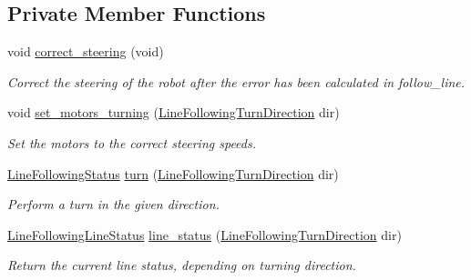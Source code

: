\subsection*{Private Member Functions}
\begin{DoxyCompactItemize}
\item 
void \hyperlink{classIDP_1_1LineFollowing_a91695c96ef09bd407b9b57dd7f6fcdfa}{correct\_\-steering} (void)
\begin{DoxyCompactList}\small\item\em Correct the steering of the robot after the error has been calculated in follow\_\-line. \item\end{DoxyCompactList}\item 
void \hyperlink{classIDP_1_1LineFollowing_a5eeec6030c425b39a8571dcb55454465}{set\_\-motors\_\-turning} (\hyperlink{namespaceIDP_aba52d8ae6ecf9eb4c7edb518bcc02544}{LineFollowingTurnDirection} dir)
\begin{DoxyCompactList}\small\item\em Set the motors to the correct steering speeds. \item\end{DoxyCompactList}\item 
\hyperlink{namespaceIDP_a5993bdfdd901fc5521c8df42dca43bd0}{LineFollowingStatus} \hyperlink{classIDP_1_1LineFollowing_a99884d2660c7425f54b3bf90e207c6da}{turn} (\hyperlink{namespaceIDP_aba52d8ae6ecf9eb4c7edb518bcc02544}{LineFollowingTurnDirection} dir)
\begin{DoxyCompactList}\small\item\em Perform a turn in the given direction. \item\end{DoxyCompactList}\item 
\hyperlink{namespaceIDP_ac3688e4c6bc9b671b09672d71ebccc40}{LineFollowingLineStatus} \hyperlink{classIDP_1_1LineFollowing_a4acd259fcdb1b2e2885fec9716eb0b93}{line\_\-status} (\hyperlink{namespaceIDP_aba52d8ae6ecf9eb4c7edb518bcc02544}{LineFollowingTurnDirection} dir)
\begin{DoxyCompactList}\small\item\em Return the current line status, depending on turning direction. \item\end{DoxyCompactList}\end{DoxyCompactItemize}
